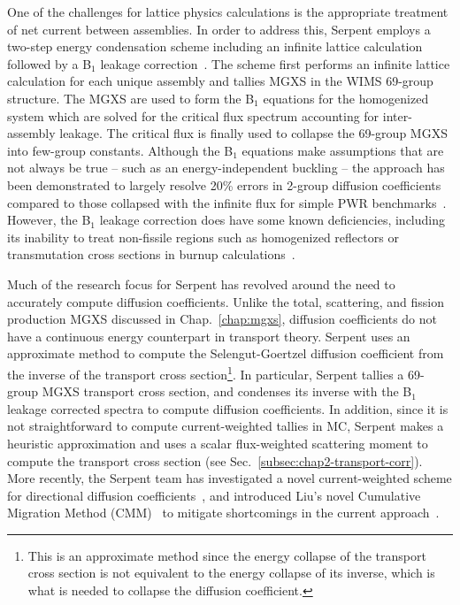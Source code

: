 One of the challenges for lattice physics calculations is the appropriate treatment of net current between assemblies. In order to address this, Serpent employs a two-step energy condensation scheme including an infinite lattice calculation followed by a B$_{1}$ leakage correction~\cite{fridman2011serpent}. The scheme first performs an infinite lattice calculation for each unique assembly and tallies \ac{MGXS} in the WIMS 69-group structure. The \ac{MGXS} are used to form the B$_{1}$ equations for the homogenized system which are solved for the critical flux spectrum accounting for inter-assembly leakage. The critical flux is finally used to collapse the 69-group \ac{MGXS} into few-group constants. Although the B$_{1}$ equations make assumptions that are not always be true -- such as an energy-independent buckling -- the approach has been demonstrated to largely resolve 20\% errors in 2-group diffusion coefficients compared to those collapsed with the infinite flux for simple \ac{PWR} benchmarks~\cite{fridman2011serpent}. However, the B$_{1}$ leakage correction does have some known deficiencies, including its inability to treat non-fissile regions such as homogenized reflectors or transmutation cross sections in burnup calculations~\cite{leppanen2016overview}.

Much of the research focus for Serpent has revolved around the need to accurately compute diffusion coefficients. Unlike the total, scattering, and fission production \ac{MGXS} discussed in Chap.~\ref{chap:mgxs}, diffusion coefficients do not have a continuous energy counterpart in transport theory. Serpent uses an approximate method to compute the Selengut-Goertzel diffusion coefficient from the inverse of the transport cross section\footnote{This is an approximate method since the energy collapse of the transport cross section is not equivalent to the energy collapse of its inverse, which is what is needed to collapse the diffusion coefficient.}. In particular, Serpent tallies a 69-group \ac{MGXS} transport cross section, and condenses its inverse with the B$_{1}$ leakage corrected spectra to compute diffusion coefficients. In addition, since it is not straightforward to compute current-weighted tallies in \ac{MC}, Serpent makes a heuristic approximation and uses a scalar flux-weighted scattering moment to compute the transport cross section (see Sec.~\ref{subsec:chap2-transport-corr}). More recently, the Serpent team has investigated a novel current-weighted scheme for directional diffusion coefficients~\cite{dorval2015diff}, and introduced Liu's novel Cumulative Migration Method (CMM)~\cite{liuphysor2016} to mitigate shortcomings in the current approach~\cite{leppanen2016overview}.

